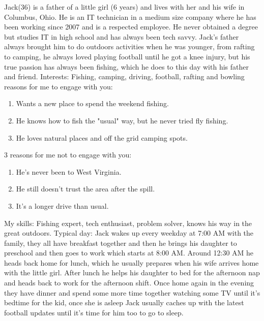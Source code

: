 Jack(36) is a father of a little girl (6 years) and lives with her and his wife in Columbus, Ohio. He is an IT technician in a medium size company where he has been working since 2007 and is a respected employee. He never obtained a degree but studies IT in high school and has always been tech savvy. Jack's father always brought him to do outdoors activities when he was younger, from rafting to camping, he always loved playing football until he got a knee injury, but his true passion has always been fishing, which he does to this day with his father and friend. 
\newline
Interests: Fishing, camping, driving, football, rafting and bowling 
 reasons for me to engage with you:
\begin{enumerate} 
\item Wants a new place to spend the weekend fishing. 
\item He knows how to fish the "usual" way, but he never tried fly fishing.
\item He loves natural places and off the grid camping spots.
\end{enumerate}
3 reasons for me not to engage with you:
\begin{enumerate}
\item He's never been to West Virginia.
\item He still doesn't trust the area after the spill. 
\item It's a longer drive than usual. 
\end{enumerate}
My skills: 
\newline
Fishing expert, tech enthusiast, problem solver, knows his way in the great outdoors. 
\newline
Typical day: 
\newline
Jack wakes up every weekday at 7:00 AM with the family, they all have breakfast together and then he brings his daughter to preschool and then goes to work which starts at 8:00 AM. Around 12:30 AM he heads back home for lunch, which he usually prepares when his wife arrives home with the little girl. After lunch he helps his daughter to bed for the afternoon nap and heads back to work for the afternoon shift. Once home again in the evening they have dinner and spend some more time together watching some TV until it's bedtime for the kid, once she is asleep Jack usually caches up with the latest football updates until it's time for him too to go to sleep. 
\newline

